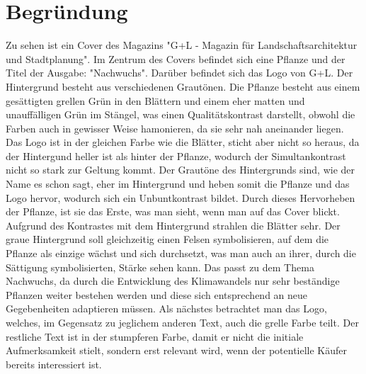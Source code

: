 \documentclass[12pt, letterpaper]{article}
\begin{document}
\section{Begründung}
Zu sehen ist ein Cover des Magazins "G+L - Magazin für Landschaftsarchitektur und Stadtplanung". Im Zentrum des Covers befindet sich eine Pflanze und der Titel der Ausgabe: "Nachwuchs". Darüber befindet sich das Logo von G+L. Der Hintergrund besteht aus verschiedenen Grautönen.
Die Pflanze besteht aus einem gesättigten grellen Grün in den Blättern und einem eher matten und unauffälligen Grün im Stängel, was einen Qualitätskontrast darstellt, obwohl die Farben auch in gewisser Weise hamonieren, da sie sehr nah aneinander liegen. Das Logo ist in der gleichen Farbe wie die Blätter, sticht aber nicht so heraus, da der Hintergund heller ist als hinter der Pflanze, wodurch der Simultankontrast nicht so stark zur Geltung kommt. Der Grautöne des Hintergrunds sind, wie der Name es schon sagt, eher im Hintergrund und heben somit die Pflanze und das Logo hervor, wodurch sich ein Unbuntkontrast bildet.
Durch dieses Hervorheben der Pflanze, ist sie das Erste, was man sieht, wenn man auf das Cover blickt. Aufgrund des Kontrastes mit dem Hintergrund strahlen die Blätter sehr. Der graue Hintergrund soll gleichzeitig einen Felsen symbolisieren, auf dem die Pflanze als einzige wächst und sich durchsetzt, was man auch an ihrer, durch die Sättigung symbolisierten, Stärke sehen kann. Das passt zu dem Thema Nachwuchs, da durch die Entwicklung des Klimawandels nur sehr beständige Pflanzen weiter bestehen werden und diese sich entsprechend an neue Gegebenheiten adaptieren müssen. Als nächstes betrachtet man das Logo, welches, im Gegensatz zu jeglichem anderen Text, auch die grelle Farbe teilt. Der restliche Text ist in der stumpferen Farbe, damit er nicht die initiale Aufmerksamkeit stielt, sondern erst relevant wird, wenn der potentielle Käufer bereits interessiert ist.
\end{document}
